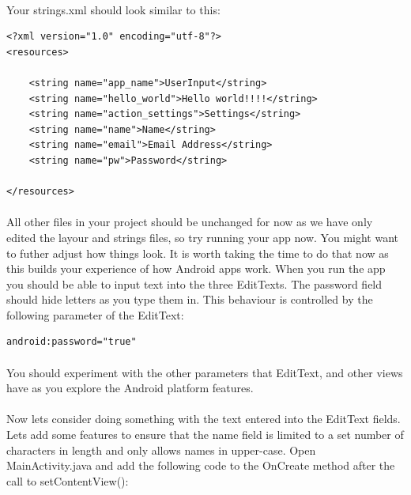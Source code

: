 \documentclass[12pt, a4paper, twoside]{book}
\begin{document}
\paragraph{} Your strings.xml should look similar to this:

\begin{lstlisting}
<?xml version="1.0" encoding="utf-8"?>
<resources>

    <string name="app_name">UserInput</string>
    <string name="hello_world">Hello world!!!!</string>
    <string name="action_settings">Settings</string>
    <string name="name">Name</string>
    <string name="email">Email Address</string>
    <string name="pw">Password</string>

</resources>
\end{lstlisting}

\paragraph{} All other files in your project should be unchanged for now as we have only edited the layour and strings files, so try running your app now. You might want to futher adjust how things look. It is worth taking the time to do that now as this builds your experience of how Android apps work. When you run the app you should be able to input text into the three EditTexts. The password field should hide letters as you type them in. This behaviour is controlled by the following parameter of the EditText: 

\begin{lstlisting}
android:password="true"
\end{lstlisting}

\paragraph{} You should experiment with the other parameters that EditText, and other views have as you explore the Android platform features.

\paragraph{} Now lets consider doing something with the text entered into the EditText fields. Lets add some features to ensure that the name field is limited to a set number of characters in length and only allows names in upper-case. Open MainActivity.java and add the following code to the OnCreate method after the call to setContentView():
\end{document}
